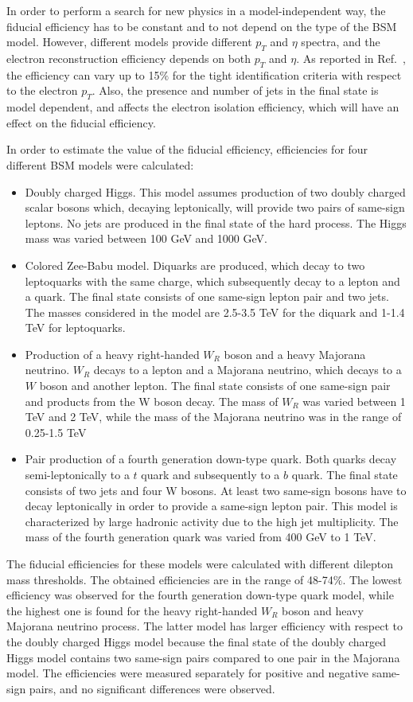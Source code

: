 In order to perform a search for new physics in a model-independent way, the fiducial efficiency has to be constant and to not depend on the type of the BSM model.
However, different models provide different $p_T$ and $\eta$ spectra, and the electron reconstruction efficiency depends on both $p_T$ and $\eta$.
As reported in Ref.~\cite{electron_tight}, the efficiency can vary up to 15$\%$ for the tight identification criteria with respect to the electron $p_T$.
Also, the presence and number of jets in the final state is model dependent, and affects the electron isolation efficiency, which will have an effect on 
the fiducial efficiency.

In order to estimate the value of the fiducial efficiency, efficiencies for four different BSM models were calculated:
\begin{itemize}
 \item Doubly charged Higgs. This model assumes production of two doubly charged scalar bosons which, decaying leptonically, will provide two pairs of same-sign leptons.
 No jets are produced in the final state of the hard process. The Higgs mass was varied between 100 GeV and 1000 GeV.
 \item Colored Zee-Babu model. Diquarks are produced, which decay to two leptoquarks with the same charge, 
 which subsequently decay to a lepton and a quark. The final state consists of one same-sign lepton pair and two jets.
 The masses considered in the model are 2.5-3.5 TeV for the diquark and 1-1.4 TeV for leptoquarks.
 \item Production of a heavy right-handed $W_R$ boson and a heavy Majorana neutrino. $W_R$ decays to a lepton and a Majorana neutrino, 
 which decays to a $W$ boson and another lepton. The final state consists of one same-sign pair and products from the W boson decay.
 The mass of $W_R$ was varied between 1 TeV and 2 TeV, while the mass of the Majorana neutrino was in the range of 0.25-1.5 TeV
 \item Pair production of a fourth generation down-type quark. Both quarks decay semi-leptonically to a $t$ quark and subsequently to a $b$ quark.
 The final state consists of two jets and four W bosons. At least two same-sign bosons have to decay leptonically in order to provide a same-sign lepton pair.
 This model is characterized by large hadronic activity due to the high jet multiplicity.
 The mass of the fourth generation quark was varied from 400 GeV to 1 TeV.
\end{itemize}
The fiducial efficiencies for these models were calculated with different dilepton mass thresholds.
The obtained efficiencies are in the range of 48-74$\%$. The lowest efficiency was observed for the fourth generation down-type quark model, while the highest one is found for the heavy right-handed $W_R$ boson and heavy Majorana neutrino process. The latter model has larger efficiency with respect to the doubly charged Higgs model
because the final state of the doubly charged Higgs model contains two same-sign pairs compared to one pair in the Majorana model.
The efficiencies were measured separately for positive and negative same-sign pairs, and no significant differences were observed.

